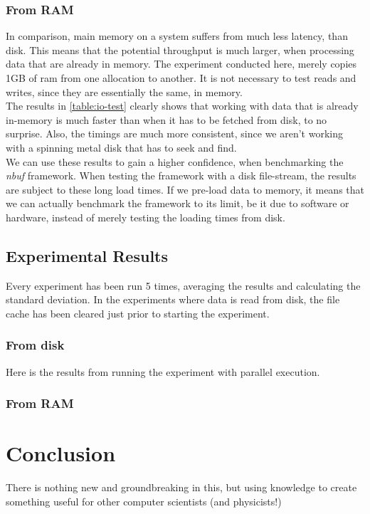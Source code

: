 \documentclass[a4paper]{article}
\newcommand{\nbuf}{\textit{nbuf} }
\begin{document}
\subsubsection{From RAM}
In comparison, main memory on a system suffers from much less latency, than disk. This means that the potential throughput is much larger, when processing data that are already in memory. The experiment conducted here, merely copies 1GB of ram from one allocation to another. It is not necessary to test reads and writes, since they are essentially the same, in memory.\\

The results in \autoref{table:io-test} clearly shows that working with data that is already in-memory is much faster than when it has to be fetched from disk, to no surprise. Also, the timings are much more consistent, since we aren't working with a spinning metal disk that has to seek and find.\\

We can use these results to gain a higher confidence, when benchmarking the \nbuf framework. When testing the framework with a disk file-stream, the results are subject to these long load times. If we pre-load data to memory, it means that we can actually benchmark the framework to its limit, be it due to software or hardware, instead of merely testing the loading times from disk.


\subsection{Experimental Results}


Every experiment has been run 5 times, averaging the results and calculating the standard deviation. In the experiments where data is read from disk, the file cache has been cleared just prior to starting the experiment.

\subsubsection{From disk}
Here is the results from running the experiment with parallel execution.


\subsubsection{From RAM}





\newpage
\section{Conclusion}
There is nothing new and groundbreaking in this, but using knowledge to create something useful for other computer scientists (and physicists!)
\end{document}
